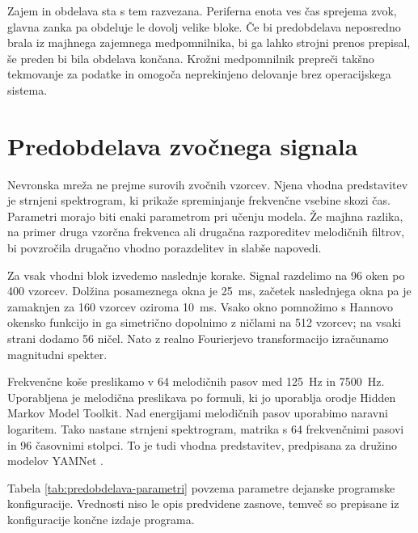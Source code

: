 Zajem in obdelava sta s tem razvezana. Periferna enota ves čas sprejema zvok,
glavna zanka pa obdeluje le dovolj velike bloke. Če bi predobdelava neposredno
brala iz majhnega zajemnega medpomnilnika, bi ga lahko strojni prenos prepisal,
še preden bi bila obdelava končana. Krožni medpomnilnik prepreči takšno
tekmovanje za podatke in omogoča neprekinjeno delovanje brez operacijskega
sistema.

\section{Predobdelava zvočnega signala}

Nevronska mreža ne prejme surovih zvočnih vzorcev. Njena vhodna predstavitev
je strnjeni spektrogram, ki prikaže spreminjanje frekvenčne vsebine
skozi čas. Parametri morajo biti enaki parametrom pri učenju modela. Že majhna
razlika, na primer druga vzorčna frekvenca ali drugačna razporeditev melodičnih
filtrov, bi povzročila drugačno vhodno porazdelitev in slabše napovedi.

Za vsak vhodni blok izvedemo naslednje korake. Signal razdelimo na 96 oken po
400 vzorcev. Dolžina posameznega okna je \SI{25}{\milli\second}, začetek
naslednjega okna pa je zamaknjen za 160 vzorcev oziroma
\SI{10}{\milli\second}. Vsako okno pomnožimo s Hannovo okensko funkcijo in ga
simetrično dopolnimo z ničlami na 512 vzorcev; na vsaki strani dodamo 56 ničel.
Nato z realno Fourierjevo transformacijo izračunamo magnitudni spekter.

Frekvenčne koše preslikamo v 64 melodičnih pasov med \SI{125}{\hertz} in
\SI{7500}{\hertz}. Uporabljena je melodična preslikava po formuli, ki jo uporablja
orodje Hidden Markov Model Toolkit. Nad energijami melodičnih pasov uporabimo
naravni logaritem. Tako nastane strnjeni spektrogram, matrika s 64 frekvenčnimi
pasovi in 96 časovnimi stolpci. To je tudi vhodna predstavitev, predpisana za
družino modelov YAMNet \cite{tensorflowyamnetrepo}.

Tabela \ref{tab:predobdelava-parametri} povzema parametre dejanske programske
konfiguracije. Vrednosti niso le opis predvidene zasnove, temveč so prepisane
iz konfiguracije končne izdaje programa.

